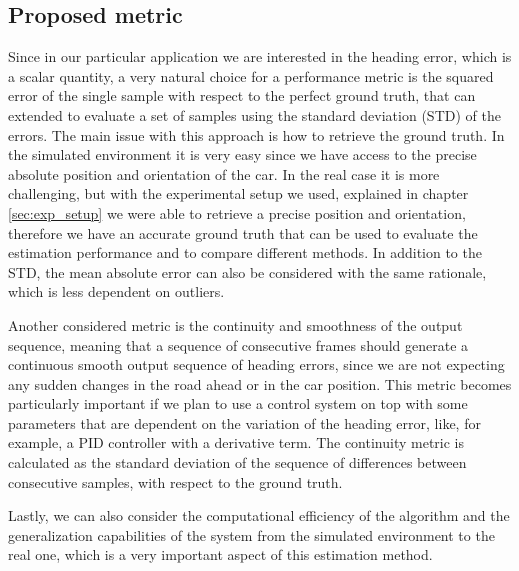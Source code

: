 \documentclass[a4paper,12pt,sort&compress]{article}
\begin{document}
    \subsection{Proposed metric}
    Since in our particular application we are interested in the heading error, which is a scalar
    quantity, a very natural choice for a performance metric is the squared error of the single sample with
    respect to the perfect ground truth, that can extended to evaluate a set of samples using the
    standard deviation (STD) of the errors. The main issue with this approach is how to retrieve the ground
    truth. In the simulated environment it is very easy since we have access to the precise absolute position
    and orientation of the car. In the real case it is more challenging, but with the experimental
    setup we used, explained in chapter \ref*{sec:exp_setup} we were able to retrieve a precise
    position and orientation, therefore we have an accurate ground truth that can be used to
    evaluate the estimation performance and to compare different methods. In addition to the STD,
    the mean absolute error can also be considered with the same rationale, which is less dependent
    on outliers. 

    Another considered metric is the continuity and smoothness of the output sequence,
    meaning that a sequence of consecutive frames should generate a continuous smooth output sequence
    of heading errors, since we are not expecting any sudden changes in the road ahead or in the car
    position. This metric becomes particularly important if we plan to use a control system on top
    with some parameters that are dependent on the variation of the heading error, like, for
    example, a PID controller with a derivative term. The continuity metric is calculated as the
    standard deviation of the sequence of differences between consecutive samples, with respect to
    the ground truth.    

    Lastly, we can also consider the computational efficiency of the algorithm and the
    generalization capabilities of the system from the simulated environment to the real one, which
    is a very important aspect of this estimation method.   
\end{document}
